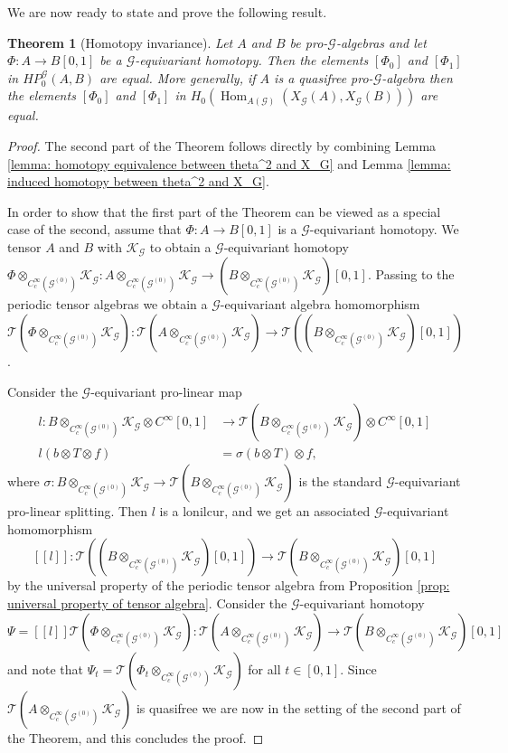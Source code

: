 \documentclass{amsart}
\newtheorem{thm}{Theorem}[section]
\newcommand{\G}{\mathcal{G}}
\newcommand{\K}{\mathcal{K}}
\newcommand{\T}{\mathcal{T}}
\newcommand{\ccinfty}{C_c^\infty}
\DeclareMathOperator{\Hom}{Hom}
\begin{document}
We are now ready to state and prove the following result. 

\begin{thm}[Homotopy invariance] \label{thm: homotopy invariance}
Let $ A $ and $ B $ be pro-$ \G $-algebras and let $ \Phi: A \rightarrow B[0,1] $ be a $ \G $-equivariant homotopy. Then the elements $ \left[\Phi_0\right] $ and $ \left[\Phi_1\right] $ in $ HP_0^\G(A,B) $ are equal. More generally, if $ A $ is a quasifree pro-$ \G $-algebra then the elements $ \left[\Phi_0\right] $ and $ \left[\Phi_1\right] $ 
in $ H_0(\Hom_{A(\G)}(X_\G(A), X_\G(B))) $ are equal.    
\end{thm}

\begin{proof}
The second part of the Theorem follows directly by combining Lemma \ref{lemma: homotopy equivalence between theta^2 and X_G} and 
Lemma \ref{lemma: induced homotopy between theta^2 and X_G}.

In order to show that the first part of the Theorem can be viewed as a special case of the second, assume that $ \Phi: A \rightarrow B[0,1] $ is a $ \G $-equivariant homotopy. 
We tensor $ A $ and $ B $ with $ \K_\G $ to obtain a $ \G $-equivariant 
homotopy $ \Phi \otimes_{\ccinfty(\G^{(0)})} \K_\G: A \otimes_{\ccinfty(\G^{(0)})} \K_\G \rightarrow (B\otimes_{\ccinfty(\G^{(0)})} \K_\G)[0,1] $. 
Passing to the periodic tensor algebras we obtain a $ \G $-equivariant algebra homomorphism $ \T(\Phi \otimes_{\ccinfty(\G^{(0)})} \K_\G): \T(A \otimes_{\ccinfty(\G^{(0)})} \K_\G) \rightarrow \T((B \otimes_{\ccinfty(\G^{(0)})} \K_\G)[0,1]) $. 

Consider the $ \G $-equivariant pro-linear map
\begin{align*}
l: B\otimes_{\ccinfty(\G^{(0)})} \K_\G \otimes C^\infty[0,1]&\rightarrow \T(B \otimes_{\ccinfty(\G^{(0)})}\K_\G) \otimes C^\infty[0,1] \\
l(b\otimes T\otimes f) &= \sigma(b \otimes T) \otimes f,
\end{align*}
where $ \sigma: B \otimes_{\ccinfty(\G^{(0)})} \K_\G \rightarrow \T(B \otimes_{\ccinfty(\G^{(0)})} \K_\G) $ is the standard $ \G $-equivariant pro-linear splitting. 
Then $ l $ is a lonilcur, and we get an associated $ \G $-equivariant homomorphism 
$$
[[l]]: \T((B\otimes_{\ccinfty(\G^{(0)})}\K_\G)[0,1]) \rightarrow \T(B \otimes_{\ccinfty(\G^{(0)})} \K_\G)[0,1]
$$
by the universal property of the periodic tensor algebra from Proposition \ref{prop: universal property of tensor algebra}. Consider the $ \G $-equivariant homotopy 
$$
\Psi = [[l]] \T(\Phi\otimes_{\ccinfty(\G^{(0)})} \K_\G): \T(A\otimes_{\ccinfty(\G^{(0)})} \K_\G) \rightarrow \T(B\otimes_{\ccinfty(\G^{(0)})}\K_\G)[0,1]
$$
and note that $ \Psi_t = \T(\Phi_t \otimes_{\ccinfty(\G^{(0)})} \K_\G) $ for all $ t \in [0,1] $.
Since $ \T(A\otimes_{\ccinfty(\G^{(0)})} \K_\G) $ is quasifree we are now in the setting of the second part of the Theorem, and this concludes the proof. 
\end{proof}
\end{document}
